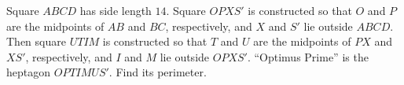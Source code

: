 Square $ABCD$ has side length $14$. Square $OPXS'$ is constructed so that $O$ and $P$ are the midpoints of $AB$ and $BC$, respectively, and $X$ and $S'$ lie outside $ABCD$. Then square $UTIM$ is constructed so that $T$ and $U$ are the midpoints of $PX$ and $XS'$, respectively, and $I$ and $M$ lie outside $OPXS'$. ``Optimus Prime'' is the heptagon $OPTIMUS'$. Find its perimeter.
